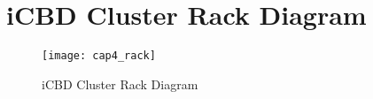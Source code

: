 \chapter{iCBD Cluster Rack Diagram}
\label{ann:cluster_diagram}

%
\begin{figure}[htbp]
	\centering
	\texttt{[image: cap4\_rack]}
	\caption{iCBD Cluster Rack Diagram}
	\label{fig:icbd_rep_rack}
\end{figure}